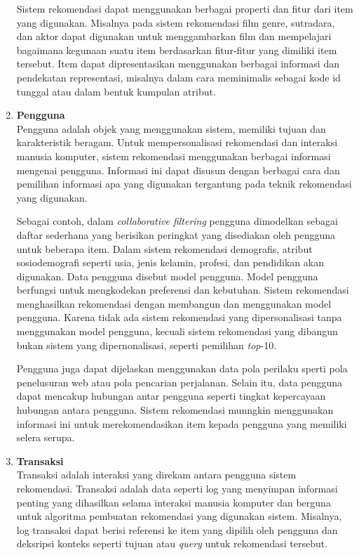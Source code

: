 \begin{enumerate}
		Sistem rekomendasi dapat menggunakan berbagai properti dan fitur dari item yang digunakan. Misalnya pada sistem rekomendasi film  genre, sutradara, dan aktor dapat digunakan untuk menggambarkan film dan mempelajari bagaimana kegunaan suatu item berdasarkan fitur-fitur yang dimiliki item tersebut. Item dapat dipresentasikan menggunakan berbagai informasi dan pendekatan representasi, misalnya dalam cara meminimalis sebagai kode id tunggal atau dalam bentuk kumpulan atribut.
	
	\item \textbf{Pengguna}\\
		Pengguna adalah objek yang menggunakan sistem, memiliki tujuan dan karakteristik beragam. Untuk mempersonalisasi rekomendasi dan interaksi manusia komputer, sistem rekomendasi menggunakan berbagai informasi mengenai pengguna. Informasi ini dapat disusun dengan berbagai cara dan pemilihan informasi apa yang digunakan tergantung pada teknik rekomendasi yang digunakan.
		
		Sebagai contoh, dalam \textit{collaborative filtering} pengguna dimodelkan sebagai daftar sederhana yang berisikan peringkat yang disediakan oleh pengguna untuk beberapa item. Dalam sistem rekomendasi demografis, atribut sosiodemografi seperti usia, jenis kelamin, profesi, dan pendidikan akan digunakan. Data pengguna disebut model pengguna. Model pengguna berfungsi untuk mengkodekan preferensi dan kebutuhan. Sistem rekomendasi menghasilkan rekomendasi dengan membangun dan menggunakan model pengguna. Karena tidak ada sistem rekomendasi yang dipersonalisasi tanpa menggunakan model pengguna, kecuali sistem rekomendasi yang dibangun bukan sistem yang dipernonalisasi, seperti pemilihan \textit{top}-10.
		
		Pengguna juga dapat dijelaskan menggunakan data pola perilaku sperti pola penelusuran web atau pola pencarian perjalanan. Selain itu, data pengguna dapat mencakup hubungan antar pengguna seperti tingkat kepercayaan hubungan antara pengguna. Sistem rekomendasi munngkin menggunakan informasi ini untuk merekomendasikan item kepada pengguna yang memiliki selera serupa.
	
	\item \textbf{Transaksi}\\
		Transaksi adalah interaksi yang direkam antara pengguna sistem rekomendasi. Transaksi adalah data seperti log yang menyimpan informasi penting yang dihasilkan selama interaksi manusia komputer dan berguna untuk algoritma pembuatan rekomendasi yang digunakan sistem. Misalnya, log transaksi dapat berisi referensi ke item yang dipilih oleh pengguna dan deksripsi konteks seperti tujuan atau \textit{query} untuk rekomendasi tersebut. 
		

\end{enumerate}
